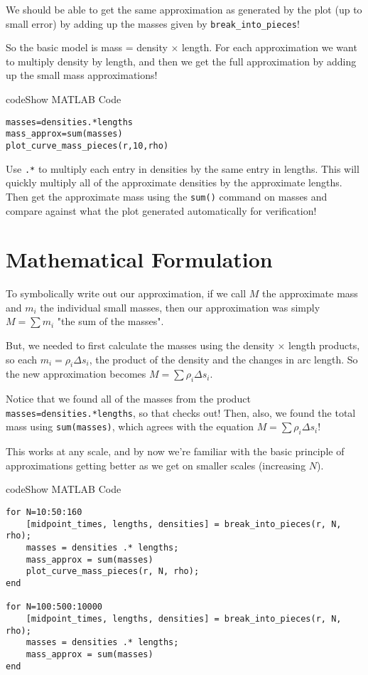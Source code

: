 \documentclass{ximera}
\begin{document}
We should be able to get the same approximation as generated by the plot (up to small error) by adding up the masses given by \texttt{break\_into\_pieces}!

So the basic model is mass = density $\times$ length. For each approximation we want to multiply density by length, and then we get the full approximation by adding up the small mass approximations!

\begin{expandable}{code}{Show MATLAB Code}
\begin{verbatim}
masses=densities.*lengths
mass_approx=sum(masses)
plot_curve_mass_pieces(r,10,rho)
\end{verbatim}
\end{expandable}

Use \texttt{.*} to multiply each entry in densities by the same entry in lengths. This will quickly multiply all of the approximate densities by the approximate lengths. Then get the approximate mass using the \texttt{sum()} command on masses and compare against what the plot generated automatically for verification!

\section*{Mathematical Formulation}

To symbolically write out our approximation, if we call $M$ the approximate mass and $m_i$ the individual small masses, then our approximation was simply $M = \sum m_i$ "the sum of the masses". 

But, we needed to first calculate the masses using the density $\times$ length products, so each $m_i = \rho_i \Delta s_i$, the product of the density and the changes in arc length. So the new approximation becomes $M = \sum \rho_i \Delta s_i$.

Notice that we found all of the masses from the product \texttt{masses=densities.*lengths}, so that checks out! Then, also, we found the total mass using \texttt{sum(masses)}, which agrees with the equation $M = \sum \rho_i \Delta s_i$!

This works at any scale, and by now we're familiar with the basic principle of approximations getting better as we get on smaller scales (increasing $N$).

\begin{expandable}{code}{Show MATLAB Code}
\begin{verbatim}
for N=10:50:160
    [midpoint_times, lengths, densities] = break_into_pieces(r, N, rho);
    masses = densities .* lengths;
    mass_approx = sum(masses)
    plot_curve_mass_pieces(r, N, rho);
end

for N=100:500:10000
    [midpoint_times, lengths, densities] = break_into_pieces(r, N, rho);
    masses = densities .* lengths;
    mass_approx = sum(masses)
end
\end{verbatim}
\end{expandable}
\end{document}

